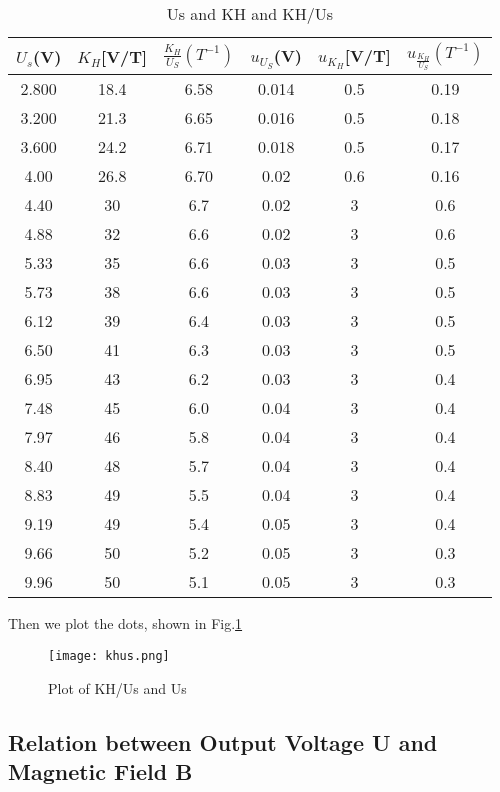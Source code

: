 \documentclass[12pt,a4paper]{article}
\begin{document}
\begin{table}[H]
    \centering
    \begin{tabular}{|c|c|c|c|c|c|}
    \hline
    $U_s$(V) &$K_H$[V/T]& $\frac{K_H}{U_S}(T^{-1})$ & $u_{U_S}$(V) &$u_{K_H}$[V/T]&$u_{\frac{K_H}{U_S}}(T^{-1})$\\ \hline
    2.800 & 18.4 & 6.58 & 0.014 & 0.5 & 0.19 \\ \hline
    3.200 & 21.3 & 6.65 & 0.016 & 0.5 & 0.18 \\ \hline
    3.600 & 24.2 & 6.71 & 0.018 & 0.5 & 0.17 \\ \hline
    4.00  & 26.8 & 6.70 & 0.02  & 0.6 & 0.16 \\ \hline
    4.40  & 30   & 6.7  & 0.02  & 3   & 0.6  \\ \hline
    4.88  & 32   & 6.6  & 0.02  & 3   & 0.6  \\ \hline
    5.33  & 35   & 6.6  & 0.03  & 3   & 0.5  \\ \hline
    5.73  & 38   & 6.6  & 0.03  & 3   & 0.5  \\ \hline
    6.12  & 39   & 6.4  & 0.03  & 3   & 0.5  \\ \hline
    6.50  & 41   & 6.3  & 0.03  & 3   & 0.5  \\ \hline
    6.95  & 43   & 6.2  & 0.03  & 3   & 0.4  \\ \hline
    7.48  & 45   & 6.0  & 0.04  & 3   & 0.4  \\ \hline
    7.97  & 46   & 5.8  & 0.04  & 3   & 0.4  \\ \hline
    8.40  & 48   & 5.7  & 0.04  & 3   & 0.4  \\ \hline
    8.83  & 49   & 5.5  & 0.04  & 3   & 0.4  \\ \hline
    9.19  & 49   & 5.4  & 0.05  & 3   & 0.4  \\ \hline
    9.66  & 50   & 5.2  & 0.05  & 3   & 0.3  \\ \hline
    9.96  & 50   & 5.1  & 0.05  & 3   & 0.3  \\ \hline
    \end{tabular}
    \caption{Us and KH and KH/Us}
    \label{uskh}
\end{table}

Then we plot the dots, shown in Fig.\ref{khusfig}

\begin{figure}[H]
    \centering
    \texttt{[image: khus.png]}
    \caption{Plot of KH/Us and Us}
    \label{khusfig}
\end{figure}

\subsection{Relation between Output Voltage U and Magnetic Field B}
\end{document}
